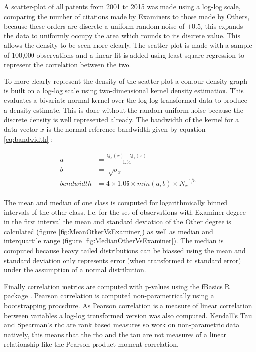 A scatter-plot of all patents from 2001 to 2015 was made using a log-log scale, comparing the number of citations made by Examiners to those made by Others, because these orders are discrete a uniform random noise of $\pm 0.5$, this expands the data to uniformly occupy the area which rounds to its discrete value. This allows the density to be seen more clearly. The scatter-plot is made with a sample of 100,000 observations and a linear fit is added using least square regression to represent the correlation between the two. 

To more clearly represent the density of the scatter-plot a contour density graph is built on a log-log scale using two-dimensional kernel density estimation. This evaluates a bivariate normal kernel over the log-log transformed data to produce a density estimate. This is done without the random uniform noise because the discrete density is well represented already. The bandwidth of the kernel for a data vector $x$ is the normal reference bandwidth given by equation \ref{eq:bandwidth} \cite[page 130]{venables2013modern}: 

\begin{align} \label{eq:bandwidth}
\begin{split}
a &= \frac{Q_3(x) - Q_1(x)}{1.34} \\
b &= \sqrt[]{\sigma_x} \\
bandwidth &= 4 \times 1.06 \times min(a,b) \times N_x^{-1/5} 
\end{split}
\end{align}

The mean and median of one class is computed for logarithmically binned intervals of the other class. I.e. for the set of observations with Examiner degree in the first interval the mean and standard deviation of the Other degree is calculated (figure \ref{fig:MeanOtherVsExaminer}) as well as median and interquartile range (figure \ref{fig:MedianOtherVsExaminer}). The median is computed because heavy tailed distributions can be biassed using the mean and standard deviation only represents error (when transformed to standard error) under the assumption of a normal distribution. 

Finally correlation metrics are computed with p-values using the fBasics R package \cite{fBasics}. Pearson correlation is computed non-parametrically using a bootstrapping procedure. As Pearson correlation is a measure of linear correlation between variables a log-log transformed version was also computed. Kendall's Tau and Spearman's rho are rank based measures so work on non-parametric data natively, this means that the rho and the tau are not measures of a linear relationship like the Pearson product-moment correlation. 

